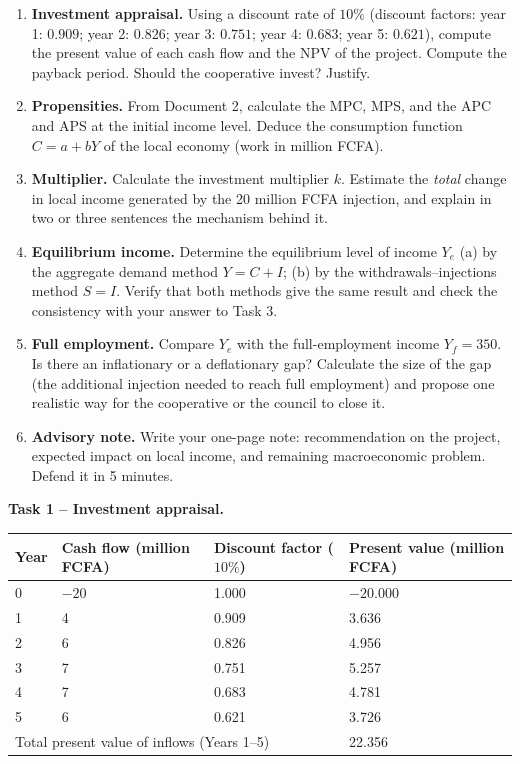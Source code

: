 \documentclass[11pt]{article}
\newcounter{popsec}
\newcounter{popsub}
\newcommand{\courssub}[1]{%
  \stepcounter{popsub}%
  \par\vspace{9pt}\noindent{\popxbold\fontsize{11.5}{13}\selectfont\color{popink}{\color{poporange}\thepopsec.\thepopsub}\hspace{6pt}#1}\par\nopagebreak\vspace{4pt}
}
\begin{document}
\courssub{Tasks}

\begin{enumerate}
\item \textbf{Investment appraisal.} Using a discount rate of $10\%$ (discount factors: year 1: $0.909$; year 2: $0.826$; year 3: $0.751$; year 4: $0.683$; year 5: $0.621$), compute the present value of each cash flow and the NPV of the project. Compute the payback period. Should the cooperative invest? Justify.
\item \textbf{Propensities.} From Document 2, calculate the MPC, MPS, and the APC and APS at the initial income level. Deduce the consumption function $C = a + bY$ of the local economy (work in million FCFA).
\item \textbf{Multiplier.} Calculate the investment multiplier $k$. Estimate the \emph{total} change in local income generated by the 20 million FCFA injection, and explain in two or three sentences the mechanism behind it.
\item \textbf{Equilibrium income.} Determine the equilibrium level of income $Y_e$ (a) by the aggregate demand method $Y = C + I$; (b) by the withdrawals--injections method $S = I$. Verify that both methods give the same result and check the consistency with your answer to Task 3.
\item \textbf{Full employment.} Compare $Y_e$ with the full-employment income $Y_f = 350$. Is there an inflationary or a deflationary gap? Calculate the size of the gap (the additional injection needed to reach full employment) and propose one realistic way for the cooperative or the council to close it.
\item \textbf{Advisory note.} Write your one-page note: recommendation on the project, expected impact on local income, and remaining macroeconomic problem. Defend it in 5 minutes.
\end{enumerate}

\courssub{Model Answer}

\textbf{Task 1 -- Investment appraisal.}

\begin{center}
\begin{tabularx}{\linewidth}{|l|X|X|X|}
\hline
\rowcolor{popblueL} Year & Cash flow (million FCFA) & Discount factor ($10\%$) & Present value (million FCFA) \\
\hline
0 & $-20$ & 1.000 & $-20.000$ \\
1 & 4 & 0.909 & 3.636 \\
2 & 6 & 0.826 & 4.956 \\
3 & 7 & 0.751 & 5.257 \\
4 & 7 & 0.683 & 4.781 \\
5 & 6 & 0.621 & 3.726 \\
\hline
\multicolumn{3}{|l|}{Total present value of inflows (Years 1--5)} & 22.356 \\
\hline
\end{tabularx}
\end{center}
\end{document}
